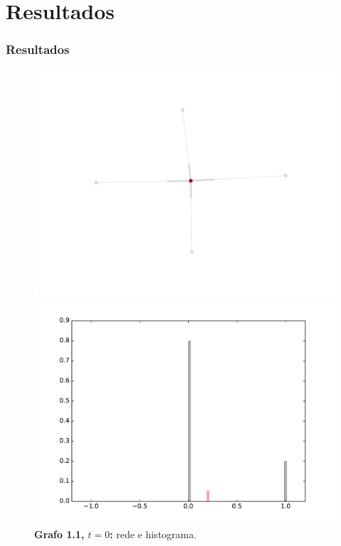 
\section{Resultados}

\begin{frame}
  \frametitle{Resultados}

  \begin{figure}
  \centering
  \begin{minipage}{5.5cm}
    \includegraphics[width=\textwidth]{./figures/11N0}
  \end{minipage}
  \begin{minipage}{5.5cm}
    \includegraphics[width=\textwidth]{./figures/11H0}
  \end{minipage}
  \vspace{5mm}
  \caption*{\textbf{Grafo 1.1, $t = 0$:} rede e histograma.}
  \end{figure}
\end{frame}

